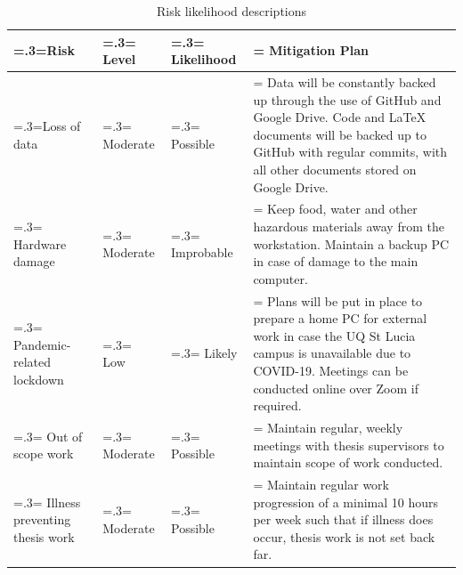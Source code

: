 \documentclass[twocolumn]{article}
\begin{document}
\begin{table}
    \begin{center}
        \begin{tabularx}{\linewidth} { 
            | >{\hsize=.3\hsize\linewidth=\hsize}X 
            | >{\hsize=.3\hsize\linewidth=\hsize}X 
            | >{\hsize=.3\hsize\linewidth=\hsize}X 
            | >{\hsize=1.1\hsize\linewidth=\hsize}X  | }
            \hline
            \textbf{Risk} & \textbf{Level} & \textbf{Likelihood} & \textbf{Mitigation Plan} \\
            \hline
            Loss of data & Moderate & Possible & Data will be constantly backed up through the use of GitHub and Google Drive. Code and LaTeX documents will be backed up to GitHub with regular commits, with all other documents stored on Google Drive.\\ \hline
            Hardware damage & Moderate & Improbable & Keep food, water and other hazardous materials away from the workstation. Maintain a backup PC in case of damage to the main computer.\\ \hline
            Pandemic-related lockdown & Low & Likely & Plans will be put in place to prepare a home PC for external work in case the UQ St Lucia campus is unavailable due to COVID-19. Meetings can be conducted online over Zoom if required.\\ \hline
            Out of scope work & Moderate & Possible & Maintain regular, weekly meetings with thesis supervisors to maintain scope of work conducted.\\ \hline
            Illness preventing thesis work & Moderate & Possible & Maintain regular work progression of a minimal 10 hours per week such that if illness does occur, thesis work is not set back far.\\ \hline
        \end{tabularx}
    \end{center}
    \caption{Risk likelihood descriptions}
    \label{table:risk}
\end{table}

\clearpage
\twocolumn
\printbibliography
\end{document}
